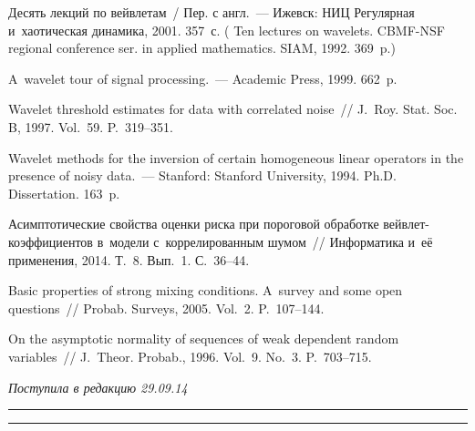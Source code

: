 \begin{multicols}{2}
{{\begin{thebibliography}{9}
 Десять лекций по вейвлетам~/
Пер. с англ.~--- Ижевск: НИЦ
Регулярная и~хаотическая динамика, 2001. 357~с.
( Ten lectures on wavelets.
CBMF-NSF regional
conference ser. in applied mathematics. SIAM, 1992. 369~p.)

 A~wavelet tour of signal processing.~---
Academic Press, 1999. 662~p.

 Wavelet threshold
estimates for data with correlated noise~// J.~Roy. Stat. Soc.
 B, 1997. Vol.~59. P.~319--351.

 Wavelet methods for the inversion of
certain homogeneous linear operators in the presence of noisy data.~---
Stanford: Stanford University, 1994. Ph.D. Dissertation. 163~p.

 Асимптотические свойства
оценки риска при пороговой обработке вейв\-лет-ко\-эф\-фи\-ци\-ен\-тов в~модели
с~коррелированным шумом~// Информатика и~её применения, 2014. Т.~8.
Вып.~1. С.~36--44.

 Basic properties of strong mixing
conditions. A~survey and some open questions~// Probab. Surveys,
2005. Vol.~2. P.~107--144.

 On the asymptotic normality of sequences of
weak dependent random variables~// J.~Theor. Probab., 1996. Vol.~9.
No.~3. P.~703--715.
 \end{thebibliography}

 }
 }

\end{multicols}

\vspace*{-9pt}

\hfill{\small\textit{Поступила в редакцию 29.09.14}}


\vspace*{12pt}

\hrule

\vspace*{2pt}

\hrule


\def\tit{ASYMPTOTIC PROPERTIES OF~RISK ESTIMATE IN~THE~PROBLEM
OF~RECONSTRUCTING IMAGES WITH CORRELATED NOISE BY~INVERTING THE~RADON TRANSFORM}

